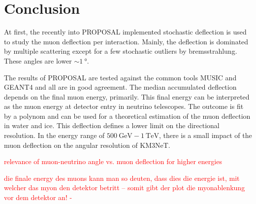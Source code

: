 \section{Conclusion}\label{sec:conclusion}

At first, the recently into PROPOSAL implemented stochastic deflection is 
used to study the muon deflection per interaction. Mainly, the deflection 
is dominated by multiple scattering except for a few stochastic 
outliers by bremsstrahlung. These angles are lower $\sim\SI{1}{\degree}$. 

The results of PROPOSAL are tested against the common tools MUSIC and 
GEANT4 and all are in good agreement.
The median accumulated deflection depends on the final muon energy, primarily. 
This final energy can be interpreted as the muon energy at detector entry 
in neutrino telescopes. 
The outcome is fit by a polynom and can be used for 
a theoretical estimation of the muon deflection in water and ice.
This deflection defines a lower limit on the directional resolution.
In the energy range of $\SI{500}{\giga\electronvolt} - \SI{1}{\tera\electronvolt}$, there is a small impact of the muon deflection on the angular 
resolution of KM3NeT.

\textcolor{red}{relevance of muon-neutrino angle vs. muon deflection for higher energies}

\textcolor{red}{die finale energy des muons kann man so deuten, dass dies die energie ist, mit welcher das myon den detektor betritt -- somit gibt der plot die myonablenkung vor dem detektor an! -}
